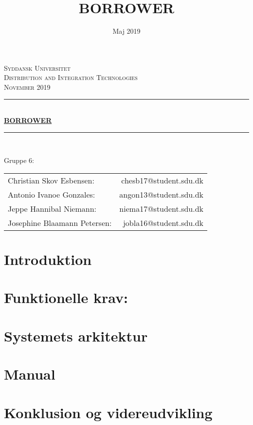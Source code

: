 \documentclass{article}
\begin{document}
\thispagestyle{empty}
\begingroup
\setlength{\columnsep}{0pt}
\endgroup

\newcommand{\hRule}{\rule{\linewidth}{0.5mm}}

\begin{center}
\textsc{\huge Syddansk Universitet}\\[0.3cm]
\textsc{\Large Distribution and Integration Technologies\\November 2019}\\[0.5cm]  
\date{Maj 2019}
\hRule \\[1cm]
{\huge \bfseries \ul{BORROWER} }\\[0.75cm] 
\hRule \\[1cm] 
\linespread{1.5}
\end{center}
\title{BORROWER}
\begin{center}
 \LARGE{Gruppe 6:}
\end{center}
\begin{center}
 \begin{tabular}{l  r}
    Christian Skov Esbensen: & chesb17@student.sdu.dk\\
    Antonio Ivanoe Gonzales: & angon13@student.sdu.dk\\
    Jeppe Hannibal Niemann: & niema17@student.sdu.dk\\
    Josephine Blaamann Petersen: & jobla16@student.sdu.dk
\end{tabular}
\end{center} 

\pagestyle{fancy}
\fancyhf{}


\newpage
\section{Introduktion}

\section{Funktionelle krav:}

\section{Systemets arkitektur}

\section{Manual}

\section{Konklusion og videreudvikling}

\end{document}

